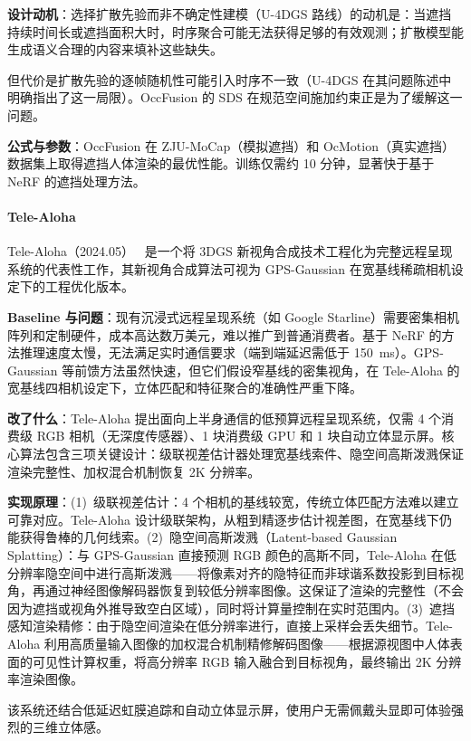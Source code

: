 \textbf{设计动机}：选择扩散先验而非不确定性建模（U-4DGS 路线）的动机是：当遮挡持续时间长或遮挡面积大时，时序聚合可能无法获得足够的有效观测；扩散模型能生成语义合理的内容来填补这些缺失。

但代价是扩散先验的逐帧随机性可能引入时序不一致（U-4DGS 在其问题陈述中明确指出了这一局限）。OccFusion 的 SDS 在规范空间施加约束正是为了缓解这一问题。

\textbf{公式与参数}：OccFusion 在 ZJU-MoCap（模拟遮挡）和 OcMotion（真实遮挡）数据集上取得遮挡人体渲染的最优性能。训练仅需约 10 分钟，显著快于基于 NeRF 的遮挡处理方法。

\paragraph{Tele-Aloha}

Tele-Aloha（2024.05）~\cite{2405_14866} 是一个将 3DGS 新视角合成技术工程化为完整远程呈现系统的代表性工作，其新视角合成算法可视为 GPS-Gaussian 在宽基线稀疏相机设定下的工程优化版本。

\textbf{Baseline 与问题}：现有沉浸式远程呈现系统（如 Google Starline）需要密集相机阵列和定制硬件，成本高达数万美元，难以推广到普通消费者。基于 NeRF 的方法推理速度太慢，无法满足实时通信要求（端到端延迟需低于 150~ms）。GPS-Gaussian 等前馈方法虽然快速，但它们假设窄基线的密集视角，在 Tele-Aloha 的宽基线四相机设定下，立体匹配和特征聚合的准确性严重下降。

\textbf{改了什么}：Tele-Aloha 提出面向上半身通信的低预算远程呈现系统，仅需 4 个消费级 RGB 相机（无深度传感器）、1 块消费级 GPU 和 1 块自动立体显示屏。核心算法包含三项关键设计：级联视差估计器处理宽基线索件、隐空间高斯泼溅保证渲染完整性、加权混合机制恢复 2K 分辨率。

\textbf{实现原理}：(1)~级联视差估计：4 个相机的基线较宽，传统立体匹配方法难以建立可靠对应。Tele-Aloha 设计级联架构，从粗到精逐步估计视差图，在宽基线下仍能获得鲁棒的几何线索。(2)~隐空间高斯泼溅（Latent-based Gaussian Splatting）：与 GPS-Gaussian 直接预测 RGB 颜色的高斯不同，Tele-Aloha 在低分辨率隐空间中进行高斯泼溅——将像素对齐的隐特征而非球谐系数投影到目标视角，再通过神经图像解码器恢复到较低分辨率图像。这保证了渲染的完整性（不会因为遮挡或视角外推导致空白区域），同时将计算量控制在实时范围内。(3)~遮挡感知渲染精修：由于隐空间渲染在低分辨率进行，直接上采样会丢失细节。Tele-Aloha 利用高质量输入图像的加权混合机制精修解码图像——根据源视图中人体表面的可见性计算权重，将高分辨率 RGB 输入融合到目标视角，最终输出 2K 分辨率渲染图像。

该系统还结合低延迟虹膜追踪和自动立体显示屏，使用户无需佩戴头显即可体验强烈的三维立体感。

